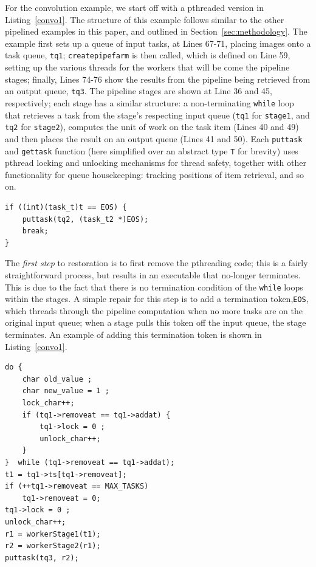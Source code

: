For the convolution example, we start off with a pthreaded version in Listing~\ref{convo1}. The structure of this example follows similar to the other pipelined examples in this paper, and outlined in Section~\ref{sec:methodology}. The example first sets up a queue of input tasks, at Lines 67-71, placing images onto a task queue, \lstinline{tq1}; \lstinline{createpipefarm} is then called, which is defined on Line 59, setting up the various threads for the workers that will be come the pipeline stages; finally, Lines 74-76 show the results from the pipeline being retrieved from an output queue, \lstinline{tq3}. The pipeline stages are shown at Line 36 and 45, respectively; each stage has a similar structure: a non-terminating \lstinline{while} loop that retrieves a task from the stage's respecting input queue (\lstinline{tq1} for \lstinline{stage1}, and \lstinline{tq2} for \lstinline{stage2}), computes the unit of work on the task item (Lines 40 and 49) and then places the result on an output queue (Lines 41 and 50). Each \lstinline{puttask} and \lstinline{gettask} function (here simplified over an abstract type \lstinline{T} for brevity) uses pthread locking and unlocking mechanisms for thread safety, together with other functionality for queue housekeeping: tracking positions of item retrieval, and so on. 

\begin{lstlisting}[label=convo1, caption={Convolution, Repaired with a Termination Token}]
if ((int)(task_t)t == EOS) {
	puttask(tq2, (task_t2 *)EOS);
	break;
}
\end{lstlisting}

The \emph{first step} to restoration is to first remove the pthreading code; this is a fairly straightforward process, but results in an executable that no-longer terminates. This is due to the fact that there is no termination condition of the \lstinline{while} loops within the stages. A simple repair for this step is to add a termination token,\lstinline{EOS}, which threads through the pipeline computation when no more tasks are on the original input queue; when a stage pulls this token off the input queue, the stage terminates. An example of adding this termination token is shown in Listing~\ref{convo1}.

\begin{lstlisting}[label=convo2, caption={Stages merged, unfolded and intermediate queue removed}]
do {
	char old_value ;
	char new_value = 1 ;
	lock_char++;        
	if (tq1->removeat == tq1->addat) {
		tq1->lock = 0 ;
		unlock_char++;
	}
}  while (tq1->removeat == tq1->addat);
t1 = tq1->ts[tq1->removeat];
if (++tq1->removeat == MAX_TASKS)
	tq1->removeat = 0;
tq1->lock = 0 ;
unlock_char++;
r1 = workerStage1(t1);
r2 = workerStage2(r1);
puttask(tq3, r2);
\end{lstlisting}

